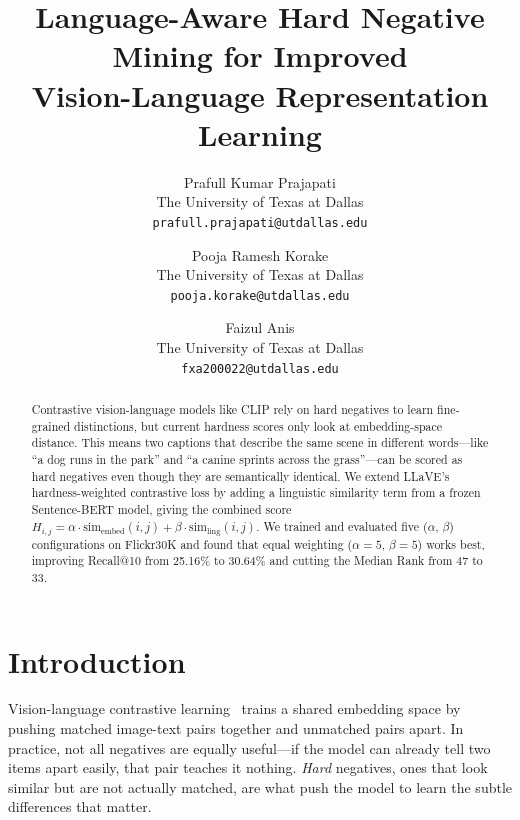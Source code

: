 \documentclass[10pt,twocolumn,letterpaper]{article}
\begin{document}
\title{Language-Aware Hard Negative Mining for Improved\\Vision-Language Representation Learning}

\author{
Prafull Kumar Prajapati \\
The University of Texas at Dallas \\
{\tt\small prafull.prajapati@utdallas.edu}
\and
Pooja Ramesh Korake \\
The University of Texas at Dallas \\
{\tt\small pooja.korake@utdallas.edu}
\and
Faizul Anis \\
The University of Texas at Dallas \\
{\tt\small fxa200022@utdallas.edu}
}

\maketitle

\begin{abstract}
Contrastive vision-language models like CLIP rely on hard negatives to learn fine-grained distinctions, but current hardness scores only look at embedding-space distance.
This means two captions that describe the same scene in different words---like ``a dog runs in the park'' and ``a canine sprints across the grass''---can be scored as hard negatives even though they are semantically identical.
We extend LLaVE's hardness-weighted contrastive loss by adding a linguistic similarity term from a frozen Sentence-BERT model, giving the combined score $H_{i,j} = \alpha \cdot \text{sim}_\text{embed}(i,j) + \beta \cdot \text{sim}_\text{ling}(i,j)$.
We trained and evaluated five ($\alpha$, $\beta$) configurations on Flickr30K and found that equal weighting ($\alpha{=}5$, $\beta{=}5$) works best, improving Recall@10 from 25.16\% to 30.64\% and cutting the Median Rank from 47 to 33.
\end{abstract}

\section{Introduction}

Vision-language contrastive learning~\cite{clip,align} trains a shared embedding space by pushing matched image-text pairs together and unmatched pairs apart.
In practice, not all negatives are equally useful---if the model can already tell two items apart easily, that pair teaches it nothing.
\emph{Hard} negatives, ones that look similar but are not actually matched, are what push the model to learn the subtle differences that matter.
\end{document}
